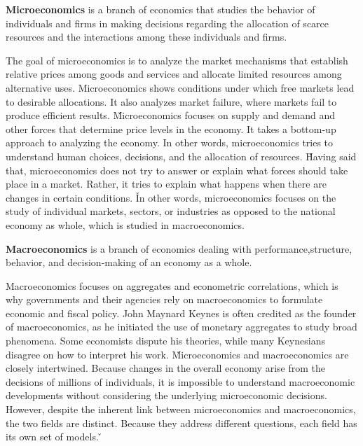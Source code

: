 \bd[Microeconomics]
\textbf{Microeconomics} is a branch of economics that studies the behavior of individuals and firms in making
decisions regarding the allocation of scarce resources and the interactions among these individuals and firms.
\ed

The goal of microeconomics is to analyze the market mechanisms that establish relative prices among goods and
services and allocate limited resources among alternative uses. Microeconomics shows conditions under which free
markets lead to desirable allocations. It also analyzes market failure, where markets fail to produce efficient
results. \v

Microeconomics focuses on supply and demand and other forces that determine price levels in the economy. It takes a
bottom-up approach to analyzing the economy. In other words, microeconomics tries to understand human choices,
decisions, and the allocation of resources. \v

Having said that, microeconomics does not try to answer or explain what forces should take place in a market. Rather,
it tries to explain what happens when there are changes in certain conditions. \v

In other words, microeconomics focuses on the study of individual markets, sectors, or industries as opposed to the
national economy as whole, which is studied in macroeconomics.

\bd[Macroeconomics]
\textbf{Macroeconomics} is a branch of economics dealing with performance,structure, behavior, and decision-making of an
economy as a whole.
\ed

Macroeconomics focuses on aggregates and econometric correlations, which is why governments and their agencies rely
on macroeconomics to formulate economic and fiscal policy. John Maynard Keynes is often credited as the founder of
macroeconomics, as he initiated the use of monetary aggregates to study broad phenomena. Some economists dispute his
theories, while many Keynesians disagree on how to interpret his work. \v

Microeconomics and macroeconomics are closely intertwined. Because changes in the overall economy arise from the
decisions of millions of individuals, it is impossible to understand macroeconomic developments without considering
the underlying microeconomic decisions. However, despite the inherent link between microeconomics and macroeconomics,
the two fields are distinct. Because they address different questions, each field has its own set of models. \v


